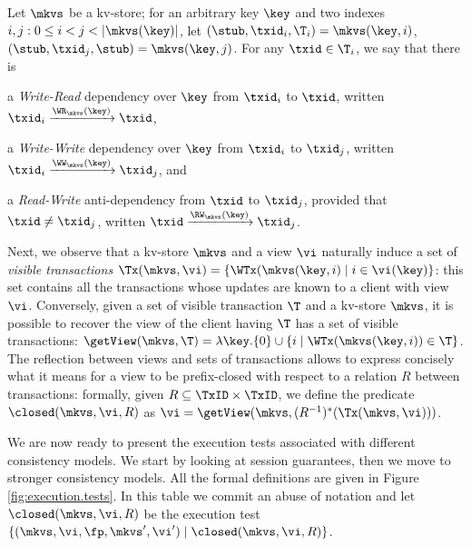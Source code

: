 Let $\mkvs$ be a kv-store; for an arbitrary key $\key$ and 
two indexes $i,j: 0 \leq i < j < \lvert \mkvs(\key) \rvert$, let 
$(\stub, \txid_{i}, \T_{i}) = \mkvs(\key, i)$, $(\stub, \txid_{j}, \stub) = \mkvs(\key,j)$. 
For any $\txid \in \T_{i}$, we say that there is 
\begin{enumerate*} 
\item a \emph{Write-Read} dependency over 
$\key$ from $\txid_{i}$ to $\txid$, written $\txid_{i} \xrightarrow{\WR_{\mkvs}(\key)} \txid$, 
\item a \emph{Write-Write} dependency over $\key$ from $\txid_{i}$ to $\txid_{j}$, 
written $\txid_{i} \xrightarrow{\WW_{\mkvs}(\key)} \txid_{j}$, and 
\item a \emph{Read-Write} anti-dependency from $\txid$ to $\txid_{j}$, provided that 
$\txid \neq \txid_{j}$, written $\txid \xrightarrow{\RW_{\mkvs}(\key)} \txid_{j}$.
\end{enumerate*}

Next, we observe that a kv-store $\mkvs$ and a view $\vi$ naturally induce a 
set of \emph{visible transactions} $\Tx(\mkvs, \vi) = \{\WTx(\mkvs(\key, i) \mid i \in \vi(\key)\}$: this 
set contains all the transactions whose updates are known to a client with view $\vi$. 
Conversely, given a set of visible transaction $\T$ and a kv-store $\mkvs$, it is 
possible to recover the view of the client having $\T$ has a set of visible transactions: 
$\getView(\mkvs, \T) = \lambda \key. \{0\} \cup \{i \mid \WTx(\mkvs(\key, i)) \in \T\}$. 
The reflection between views and sets of transactions allows to express concisely 
what it means for a view to be prefix-closed with respect to a relation $R$ between 
transactions: formally, given $R \subseteq \TxID \times \TxID$, we define the predicate  
$\closed(\mkvs, \vi, R)$ as $\vi = \getView(\mkvs, (R^{-1})^{\ast}(\Tx(\mkvs, \vi)))$.

We are now ready to present the execution tests  associated with different consistency models. 
We start by looking at session guarantees, then we move to stronger consistency models. 
All the formal definitions are given in Figure \ref{fig:execution.tests}. In this table we 
commit an abuse of notation and let $\closed(\mkvs, \vi, R)$ be the execution test 
$\{(\mkvs, \vi, \fp, \mkvs', \vi') \mid \closed(\mkvs, \vi, R)\}$.

